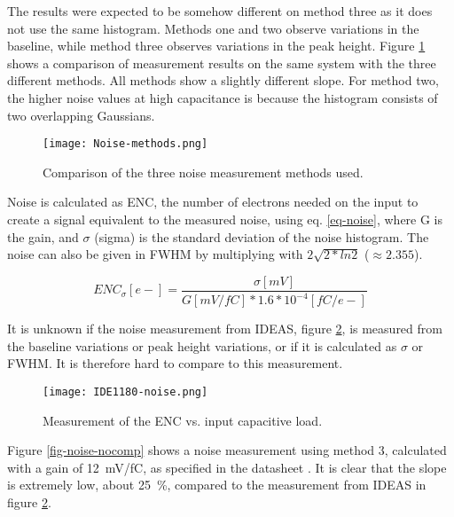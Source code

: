 \documentclass[../main/thesis.tex]{subfiles}
\begin{document}
The results were expected to be somehow different on method three as it does not use the same histogram. Methods one and two observe variations in the baseline, while method three observes variations in the peak height. Figure \ref{fig-noise-methods} shows a comparison of measurement results on the same system with the three different methods. All methods show a slightly different slope. For method two, the higher noise values at high capacitance is because the histogram consists of two overlapping Gaussians.  %

\begin{figure}[h!]   %
	\centering
	\texttt{[image: Noise-methods.png]}
	\caption{Comparison of the three noise measurement methods used.}
	\label{fig-noise-methods}
\end{figure} 

Noise is calculated as \acrfull{ENC}, the number of electrons needed on the input to create a signal equivalent to the measured noise, using eq. \ref{eq-noise}, where G is the gain, and $\sigma$ (sigma) is the standard deviation of the noise histogram. The noise can also be given in \gls{FWHM} by multiplying with $2\sqrt{2*ln2}$ ($\approx 2.355$). 

\begin{equation}%
ENC_\sigma [e-] = \frac{\sigma [mV]}{G [mV/fC]*1.6*10^{-4} [fC/e-]}
\label{eq-noise}
\end{equation}

It is unknown if the noise measurement from IDEAS, figure \ref{fig-ide-noise}, is measured from the baseline variations or peak height variations, or if it is calculated as $\sigma$ or \gls{FWHM}. It is therefore hard to compare to this measurement. 

\begin{figure}%
	\centering
	\texttt{[image: IDE1180-noise.png]}
	\caption{Measurement of the \gls{ENC} vs. input capacitive load. \citep{IDE1180}}
	\label{fig-ide-noise}
\end{figure} 

Figure \ref{fig-noise-nocomp} shows a noise measurement using method 3, calculated with a gain of 12~mV/fC, as specified in the datasheet \citep{IDE1180}. It is clear that the slope is extremely low, about 25~\%, compared to the measurement from IDEAS in figure \ref{fig-ide-noise}. 
\end{document}
